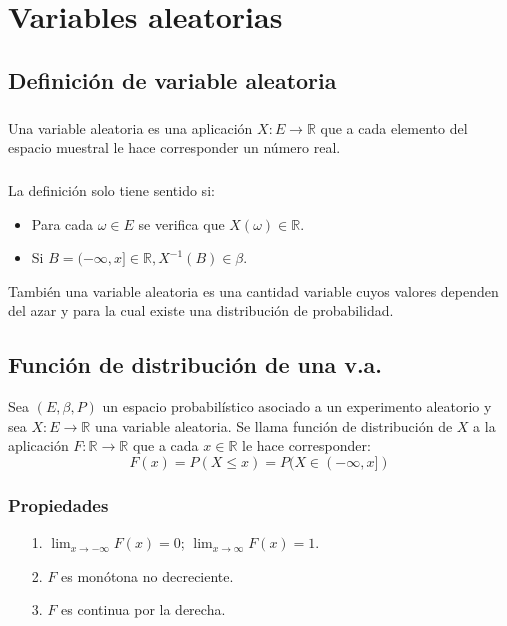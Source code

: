 \chapter{Variables aleatorias}
\section{Definición de variable aleatoria}
\paragraph{}
Una variable aleatoria es una aplicación $X:E\rightarrow\mathbb{R}$ que a cada elemento del espacio muestral le hace corresponder un número real.

\paragraph{}
La definición solo tiene sentido si:
\begin{itemize}
\item Para cada $\omega \in E$ se verifica que $X(\omega)\in\mathbb{R}$.
\item Si $B=(-\infty,x]\in\mathbb{R}, X^{-1}(B)\in\beta$.
\end{itemize}

También una variable aleatoria es una cantidad variable cuyos valores dependen del azar y para la cual existe una distribución de probabilidad.


\section{Función de distribución de una v.a.}
Sea $(E,\beta,P)$ un espacio probabilístico asociado a un experimento aleatorio y sea $X:E\rightarrow\mathbb{R}$ una variable aleatoria. Se llama función de distribución de $X$ a la aplicación $F:\mathbb{R}\rightarrow\mathbb{R}$ que a cada $x\in\mathbb{R}$ le hace corresponder:
\[F(x)=P(X \leq x)=P(X\in(-\infty,x])\]

\subsection{Propiedades}
\begin{itemize}
\item[1.]$\lim_{x \to -\infty} F(x)=0$; $\lim_{x \to \infty} F(x)=1$.
\item[2.]$F$ es monótona no decreciente.
\item[3.]$F$ es continua por la derecha.
\end{itemize}

